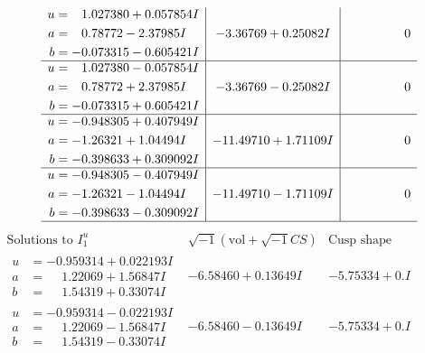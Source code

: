 \documentclass[1p]{elsarticle_modified}
\theoremstyle{definition}
\newcommand{\I}{\sqrt{-1}}
\begin{document}
$$\begin{array}{c|c|c}
\begin{aligned}
u &= \phantom{-}1.027380 + 0.057854 I \\
a &= \phantom{-}0.78772 - 2.37985 I \\
b &= -0.073315 - 0.605421 I\end{aligned}
 & -3.36769 + 0.25082 I & \phantom{-0.000000 } 0 \\ \hline\begin{aligned}
u &= \phantom{-}1.027380 - 0.057854 I \\
a &= \phantom{-}0.78772 + 2.37985 I \\
b &= -0.073315 + 0.605421 I\end{aligned}
 & -3.36769 - 0.25082 I & \phantom{-0.000000 } 0 \\ \hline\begin{aligned}
u &= -0.948305 + 0.407949 I \\
a &= -1.26321 + 1.04494 I \\
b &= -0.398633 + 0.309092 I\end{aligned}
 & -11.49710 + 1.71109 I & \phantom{-0.000000 } 0 \\ \hline\begin{aligned}
u &= -0.948305 - 0.407949 I \\
a &= -1.26321 - 1.04494 I \\
b &= -0.398633 - 0.309092 I\end{aligned}
 & -11.49710 - 1.71109 I & \phantom{-0.000000 } 0\\
 \hline 
 \end{array}$$\newpage$$\begin{array}{c|c|c}  
\text{Solutions to }I^u_{1}& \I (\text{vol} + \sqrt{-1}CS) & \text{Cusp shape}\\
 \hline 
\begin{aligned}
u &= -0.959314 + 0.022193 I \\
a &= \phantom{-}1.22069 + 1.56847 I \\
b &= \phantom{-}1.54319 + 0.33074 I\end{aligned}
 & -6.58460 + 0.13649 I & -5.75334 + 0. I\phantom{ +0.000000I} \\ \hline\begin{aligned}
u &= -0.959314 - 0.022193 I \\
a &= \phantom{-}1.22069 - 1.56847 I \\
b &= \phantom{-}1.54319 - 0.33074 I\end{aligned}
 & -6.58460 - 0.13649 I & -5.75334 + 0. I\phantom{ +0.000000I} \\ \hline\begin{aligned}

\end{aligned}
\end{array}$$
\end{document}
